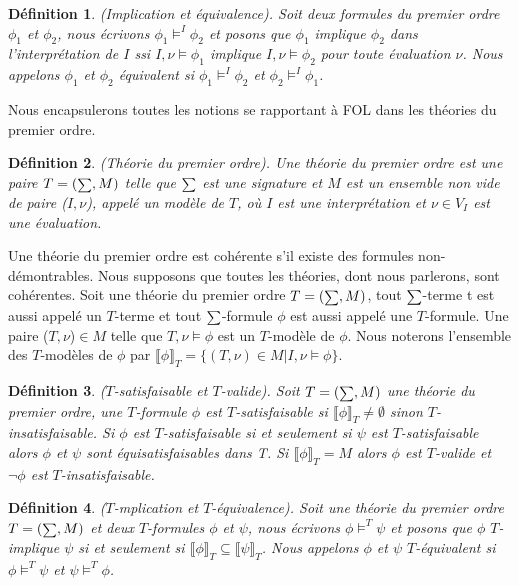 \documentclass[9pt,openany]{book}
\newcommand\phibra{\llbracket\phi\rrbracket}
\newcommand\psibra{\llbracket\psi\rrbracket}
\newtheorem{definition}{D\'efinition}[section]
\begin{document}
\begin{definition}
(Implication et \'equivalence). Soit deux formules du premier ordre $\phi_{1}$ et $\phi_{2}$, nous \'ecrivons $\phi_{1}\models^{I}\phi_{2}$ et posons que $\phi_{1}$ implique $\phi_{2}$ dans l'interpr\'etation de $I$ ssi $I,\nu\models\phi_{1}$ implique $I,\nu\models\phi_{2}$ pour toute \'evaluation $\nu$. Nous appelons $\phi_{1}$  et $\phi_{2}$  \'equivalent si $\phi_{1}\models^{I}\phi_{2}$ et $\phi_{2}\models^{I}\phi_{1}$.
\end{definition}\par
Nous encapsulerons toutes les notions se rapportant \`a FOL dans les th\'eories du premier ordre.

\begin{definition}
(Th\'eorie du premier ordre). Une th\'eorie du premier ordre est une paire $T=(\mathsmaller \sum,M)$ telle que $\mathsmaller \sum$ est une signature et $M$ est un ensemble non vide de paire ($I,\nu$), appel\'e un mod\`ele de $T$, o\`u $I$ est une interpr\'etation et $\nu\in V_{I}$ est une \'evaluation.
\end{definition}

Une th\'eorie du premier ordre est coh\'erente s'il existe des formules non-d\'emontrables. Nous supposons que toutes les th\'eories, dont nous parlerons, sont coh\'erentes. Soit une th\'eorie du premier ordre $T = (\mathsmaller \sum,M)$, tout $\mathsmaller \sum$-terme t est aussi appel\'e un $T$-terme et tout $\mathsmaller \sum$-formule $\phi$ est aussi appel\'e une $T$-formule. Une paire ($T,\nu$)$\in M$ telle que $T,\nu\models\phi$ est un $T$-mod\`ele de $\phi$. Nous noterons l'ensemble des $T$-mod\`eles de $\phi$ par $\phibra_{T} = \{(T,\nu)\in M | I,\nu\models\phi\}$.

\begin{definition}
($T$-satisfaisable et $T$-valide). Soit $T = (\mathsmaller\sum,M)$ une th\'eorie du premier ordre, une $T$-formule $\phi$ est $T$-satisfaisable si $\phibra_{T} \neq \emptyset$ sinon $T$-insatisfaisable. Si $\phi$ est $T$-satisfaisable si et seulement si $\psi$ est $T$-satisfaisable alors $\phi$ et $\psi$ sont \'equisatisfaisables dans T. Si $\phibra_{T} = M$ alors $\phi$ est $T$-valide et $\neg\phi$ est $T$-insatisfaisable.
\end{definition}

\begin{definition}
($T$-mplication et $T$-\'equivalence). Soit une th\'eorie du premier ordre $T = (\mathsmaller \sum,M)$ et deux $T$-formules $\phi$ et $\psi$, nous \'ecrivons $\phi\models^{T}\psi$ et posons que $\phi$ $T$-implique $\psi$ si et seulement si $\phibra_{T}\subseteq \psibra_{T}$. Nous appelons $\phi$  et $\psi$  $T$-\'equivalent si $\phi\models^{T}\psi$ et $\psi\models^{T}\phi$.
\end{definition}\par
\end{document}
